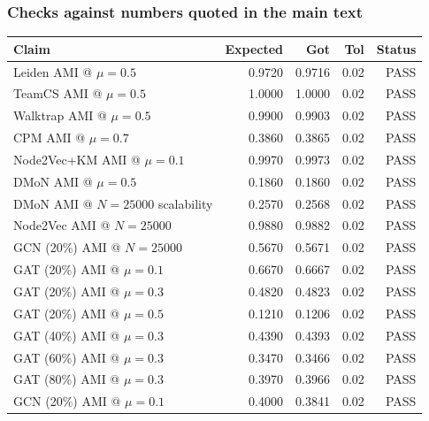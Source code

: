 \subsubsection{Checks against numbers quoted in the main text}
\begin{tabular}{p{6.5cm}rrrr}
\toprule
Claim & Expected & Got & Tol & Status \\
\midrule
Leiden AMI @ $\mu{=}0.5$ & 0.9720 & 0.9716 & 0.02 & PASS \\
TeamCS AMI @ $\mu{=}0.5$ & 1.0000 & 1.0000 & 0.02 & PASS \\
Walktrap AMI @ $\mu{=}0.5$ & 0.9900 & 0.9903 & 0.02 & PASS \\
CPM AMI @ $\mu{=}0.7$ & 0.3860 & 0.3865 & 0.02 & PASS \\
Node2Vec+KM AMI @ $\mu{=}0.1$ & 0.9970 & 0.9973 & 0.02 & PASS \\
DMoN AMI @ $\mu{=}0.5$ & 0.1860 & 0.1860 & 0.02 & PASS \\
DMoN AMI @ $N{=}25000$ scalability & 0.2570 & 0.2568 & 0.02 & PASS \\
Node2Vec AMI @ $N{=}25000$ & 0.9880 & 0.9882 & 0.02 & PASS \\
GCN (20\%) AMI @ $N{=}25000$ & 0.5670 & 0.5671 & 0.02 & PASS \\
GAT (20\%) AMI @ $\mu{=}0.1$ & 0.6670 & 0.6667 & 0.02 & PASS \\
GAT (20\%) AMI @ $\mu{=}0.3$ & 0.4820 & 0.4823 & 0.02 & PASS \\
GAT (20\%) AMI @ $\mu{=}0.5$ & 0.1210 & 0.1206 & 0.02 & PASS \\
GAT (40\%) AMI @ $\mu{=}0.3$ & 0.4390 & 0.4393 & 0.02 & PASS \\
GAT (60\%) AMI @ $\mu{=}0.3$ & 0.3470 & 0.3466 & 0.02 & PASS \\
GAT (80\%) AMI @ $\mu{=}0.3$ & 0.3970 & 0.3966 & 0.02 & PASS \\
GCN (20\%) AMI @ $\mu{=}0.1$ & 0.4000 & 0.3841 & 0.02 & PASS \\
\bottomrule
\end{tabular}
